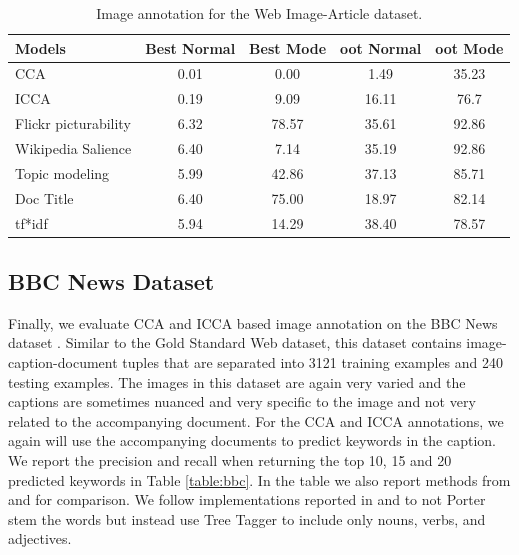 \begin{table}[t]
\centering
\begin{tabular}{l|cc|cc}
Models & Best Normal & Best Mode & oot Normal & oot Mode\\\hline
CCA & 0.01 & 0.00 & 1.49 & 35.23\\
ICCA & 0.19 & 9.09 & 16.11 & 76.7 \\
\midrule
\midrule
Flickr picturability & 6.32 & 78.57 & 35.61 & 92.86\\
Wikipedia Salience & 6.40 & 7.14 & 35.19 & 92.86 \\
Topic modeling & 5.99 & 42.86 & 37.13 & 85.71 \\
\midrule
\midrule
Doc Title & 6.40 & 75.00 & 18.97 & 82.14\\
tf*idf & 5.94 & 14.29 & 38.40 & 78.57\\
\bottomrule
\end{tabular}
\caption{Image annotation for the Web Image-Article dataset.}
\label{table:gold}
\vspace{-0.1in}
\end{table}


\subsection{BBC News Dataset}

Finally, we evaluate CCA and ICCA based image annotation on the BBC News dataset
\cite{feng2008automatic}. Similar to the Gold Standard Web dataset, this dataset contains
image-caption-document tuples that are separated into 3121 training examples and 240
testing examples. The images in this dataset are again very varied and the captions are
sometimes nuanced and very specific to the image and not very related to the accompanying
document. For the CCA and ICCA annotations, we again will use the accompanying documents
to predict keywords in the caption. We report the precision and recall when returning the
top 10, 15 and 20 predicted keywords in Table \ref{table:bbc}. In the table we also report
methods from \cite{feng2008automatic} and \cite{leong2010text} for comparison.  We follow
implementations reported in \cite{feng2008automatic} and \cite{leong2010text} to not
Porter stem the words but instead use Tree Tagger\cite{schmid1994probabilistic} to include
only nouns, verbs, and adjectives.


